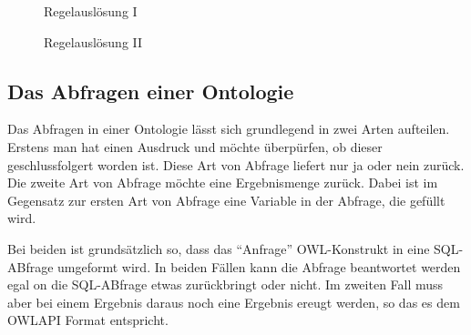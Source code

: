 \begin{figure}[htp]
\begin{center}
  \caption{Regelauslösung I}
  \label{diagram-ruleexecution1}
\end{center}
\end{figure}

\begin{figure}[htp]
\begin{center}
  \caption{Regelauslösung II}
  \label{diagram-ruleexecution2}
\end{center}
\end{figure}

\subsection{Das Abfragen einer Ontologie}
Das Abfragen in einer Ontologie lässt sich grundlegend in zwei Arten aufteilen. Erstens man hat einen Ausdruck und möchte überpürfen, ob dieser geschlussfolgert worden ist. Diese Art von Abfrage liefert nur ja oder nein zurück. Die zweite Art von Abfrage möchte eine Ergebnismenge zurück. Dabei ist im Gegensatz zur ersten Art von Abfrage eine Variable in der Abfrage, die gefüllt wird.

Bei beiden ist grundsätzlich so, dass das ``Anfrage'' OWL-Konstrukt in eine SQL-ABfrage umgeformt wird. In beiden Fällen kann die Abfrage beantwortet werden egal on die SQL-ABfrage etwas zurückbringt oder nicht. Im zweiten Fall muss aber bei einem Ergebnis daraus noch eine Ergebnis ereugt werden, so das es dem OWLAPI Format entspricht.


